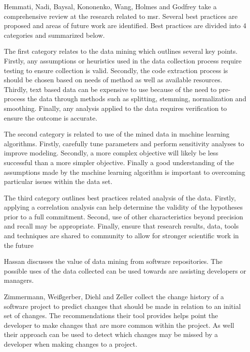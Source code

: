 Hemmati, Nadi, Baysal, Kononenko, Wang, Holmes and Godfrey take a comprehensive review at the research related to \gls{msr}\cite{Hemmati2013}. Several best practices are proposed and areas of future work are identified. Best practices are divided into 4 categories and summarized below.

The first category relates to the data mining which outlines several key points. Firstly, any assumptions or heuristics used in the data collection process require testing to ensure collection is valid. Secondly, the code extraction process is should be chosen based on needs of method as well as available resources. Thirdly, text based data can be expensive to use because of the need to pre-process the data through methods such as splitting, stemming, normalization and smoothing. Finally, any analysis applied to the data requires verification to ensure the outcome is accurate.

The second category is related to use of the mined data in machine learning algorithms. Firstly, carefully tune parameters and perform sensitivity analyses to improve modeling. Secondly, a more complex objective will likely be less successful than a more simpler objective. Finally a good understanding of the assumptions made by the machine learning algorithm is important to overcoming particular issues within the data set.

The third category outlines best practices related analysis of the data. Firstly, applying a correlation analysis can help determine the validity of the hypotheses prior to a full commitment. Second, use of other characteristics beyond precision and recall may be appropriate. Finally, ensure that research results, data, tools and techniques are shared to community to allow for stronger scientific work in the future


Hassan discusses the value of data mining from software repositories. The possible uses of the data collected can be used towards are assisting developers or managers.%

Zimmermann, Wei{\ss}gerber, Diehl and Zeller collect the change history of a software project to predict changes that should be made in relation to an initial set of changes\cite{Zimmermann2005a}. The recommendations their tool provides helps point the developer to make changes that are more common within the project. As well their approach can be used to detect which changes may be missed by a developer when making changes to a project.

